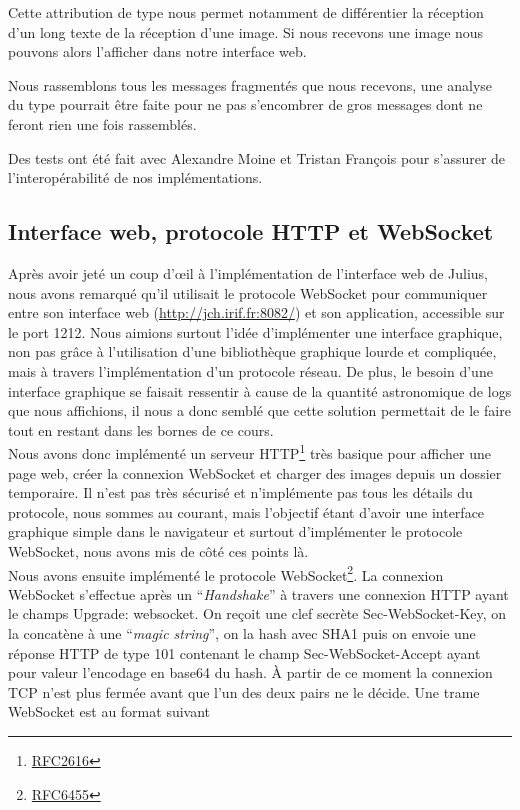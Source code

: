 \documentclass[a4paper,10pt]{article} %
\begin{document}
Cette attribution de type nous permet notamment de différentier la réception d'un long texte de la réception d'une image. Si nous recevons une image nous pouvons alors l'afficher dans notre interface web.

Nous rassemblons tous les messages fragmentés que nous recevons, une analyse du type pourrait être faite pour ne pas s'encombrer de gros messages dont ne feront rien une fois rassemblés.

Des tests ont été fait avec \textrm{Alexandre Moine} et \textrm{Tristan François} pour s'assurer de l'interopérabilité de nos implémentations.

\subsection{Interface web, protocole HTTP et WebSocket\label{sec:web}}

Après avoir jeté un coup d’œil à l'implémentation de l'interface web de Julius, nous avons remarqué qu'il utilisait le protocole WebSocket pour communiquer entre son interface web (\href{http://jch.irif.fr:8082/}{http://jch.irif.fr:8082/}) et son application, accessible sur le port 1212. Nous aimions surtout l'idée d'implémenter une interface graphique, non pas grâce à l'utilisation d'une bibliothèque graphique lourde et compliquée, mais à travers l'implémentation d'un protocole réseau. De plus, le besoin d'une interface graphique se faisait ressentir à cause de la quantité astronomique de logs que nous affichions, il nous a donc semblé que cette solution permettait de le faire tout en restant dans les bornes de ce cours.\\

Nous avons donc implémenté un serveur \textrm{HTTP}\footnote{\href{https://tools.ietf.org/html/rfc2616}{RFC2616}} très basique pour afficher une page web, créer la connexion WebSocket et charger des images depuis un dossier temporaire. Il n'est pas très sécurisé et n'implémente pas tous les détails du protocole, nous sommes au courant, mais l'objectif étant d'avoir une interface graphique simple dans le navigateur et surtout d'implémenter le protocole WebSocket, nous avons mis de côté ces points là.\\

Nous avons ensuite implémenté le protocole \textrm{WebSocket}\footnote{\href{https://tools.ietf.org/html/rfc6455}{RFC6455}}. La connexion WebSocket s'effectue après un ``\textit{Handshake}'' à travers une connexion \textrm{HTTP} ayant le champs \textrm{Upgrade: websocket}. On reçoit une clef secrète \textrm{Sec-WebSocket-Key}, on la concatène à une ``\textit{magic string}'', on la hash avec \textrm{SHA1} puis on envoie une réponse \textrm{HTTP} de type 101 contenant le champ \textrm{Sec-WebSocket-Accept} ayant pour valeur l'encodage en base64 du hash. À partir de ce moment la connexion TCP n'est plus fermée avant que l'un des deux pairs ne le décide.
Une trame WebSocket est au format suivant
\end{document}
